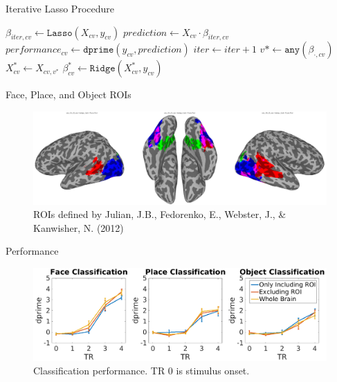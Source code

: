 \documentclass[final]{beamer}
\newlength{\introcolwid}
\begin{document}
\begin{frame}[t]
\begin{columns}[t]
\begin{column}{\introcolwid}
   		\begin{block}{Iterative Lasso Procedure}
			{\small\begin{algorithmic}
				\Repeat
						\State $\beta_{iter,cv} \gets \mathtt{Lasso}(X_{cv},y_{cv})$
						\State $prediction \gets X_{cv} \cdot \beta_{iter,cv}$
						\State $performance_{cv} \gets \mathtt{dprime}(y_{cv},prediction)$
					\EndFor
					\State $iter \gets iter+1$
					\State $v* \gets \mathtt{any}(\beta_{\cdot,cv})$
					\State $X_{cv}^* \gets X_{cv,v^*}$
					\State $\beta_{cv}^* \gets \mathtt{Ridge}(X_{cv}^*,y_{cv})$
				\EndFor
			\end{algorithmic}}
  		\end{block}
  		
		\begin{block}{Face, Place, and Object ROIs}
			\begin{figure}
				\includegraphics[width=\textwidth]{figures/ROIs.png}
				\caption{ROIs defined by Julian, J.B., Fedorenko, E., Webster, J., \& Kanwisher, N. (2012)\cite{Julian20122357}}
			\end{figure}
		\end{block}
  				
  		\begin{block}{Performance}
			\begin{figure}
				\includegraphics[width=\textwidth]{figures/Summary_By_TR.png}
				\caption{Classification performance. TR 0 is stimulus onset.}
			\end{figure}			
  		\end{block}
   	\end{column}


\end{columns}
\end{frame}
\end{document}
